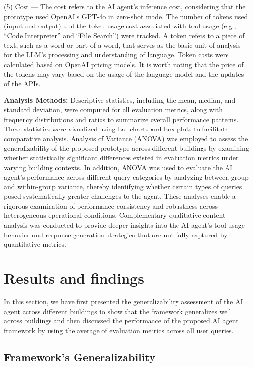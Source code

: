 \documentclass[final,3p,times]{elsarticle}
\begin{document}
(5) Cost --- The cost refers to the AI agent's inference cost, considering that the prototype used OpenAI’s GPT-4o in zero-shot mode. The number of tokens used (input and output) and the token usage cost associated with tool usage (e.g., “Code Interpreter” and “File Search”) were tracked. A token refers to a piece of text, such as a word or part of a word, that serves as the basic unit of analysis for the LLM's processing and understanding of language. Token costs were calculated based on OpenAI pricing models. It is worth noting that the price of the tokens may vary based on the usage of the language model and the updates of the APIs.

\textbf{Analysis Methods:} Descriptive statistics, including the mean, median, and standard deviation, were computed for all evaluation metrics, along with frequency distributions and ratios to summarize overall performance patterns. These statistics were visualized using bar charts and box plots to facilitate comparative analysis. Analysis of Variance (ANOVA) was employed to assess the generalizability of the proposed prototype across different buildings by examining whether statistically significant differences existed in evaluation metrics under varying building contexts. In addition, ANOVA was used to evaluate the AI agent’s performance across different query categories by analyzing between-group and within-group variance, thereby identifying whether certain types of queries posed systematically greater challenges to the agent. These analyses enable a rigorous examination of performance consistency and robustness across heterogeneous operational conditions. Complementary qualitative content analysis was conducted to provide deeper insights into the AI agent’s tool usage behavior and response generation strategies that are not fully captured by quantitative metrics.

\section{Results and findings}
\label{sec:Findings}

In this section, we have first presented the generalizability assessment of the AI agent across different buildings to show that the framework generalizes well across buildings and then discussed the performance of the proposed AI agent framework by using the average of evaluation metrics across all user queries.

\subsection{Framework's Generalizability}
\end{document}
